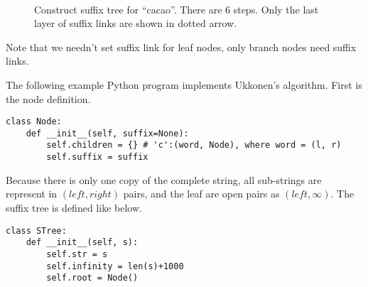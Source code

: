 \documentclass[UTF8]{article}
\begin{document}
\begin{figure}[htbp]
  \centering
   \\
  \caption{Construct suffix tree for ``cacao''. There are 6 steps. Only the last layer of suffix links are shown in dotted arrow.}
  \label{fig:cons-stree-cacao}
\end{figure}

Note that we needn't set suffix link for leaf nodes, only branch nodes
need suffix links.

The following example Python program implements Ukkonen's algorithm.
First is the node definition.

\lstset{language=Python}
\begin{lstlisting}
class Node:
    def __init__(self, suffix=None):
        self.children = {} # 'c':(word, Node), where word = (l, r)
        self.suffix = suffix
\end{lstlisting}

Because there is only one copy of the complete string, all sub-strings
are represent in $(left, right)$ pairs, and the leaf are open pairs
as $(left, \infty)$. The suffix tree is defined like below.

\begin{lstlisting}
class STree:
    def __init__(self, s):
        self.str = s
        self.infinity = len(s)+1000
        self.root = Node()
\end{lstlisting}
\end{document}

